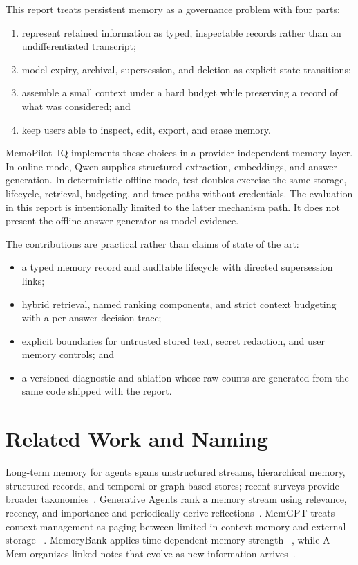 \documentclass[11pt]{article}
\newcommand{\sysname}{MemoPilot~IQ}
\begin{document}
This report treats persistent memory as a governance problem with four parts:

\begin{enumerate}[leftmargin=1.5em,itemsep=2pt]
  \item represent retained information as typed, inspectable records rather
  than an undifferentiated transcript;
  \item model expiry, archival, supersession, and deletion as explicit state
  transitions;
  \item assemble a small context under a hard budget while preserving a record
  of what was considered; and
  \item keep users able to inspect, edit, export, and erase memory.
\end{enumerate}

\sysname{} implements these choices in a provider-independent memory layer. In
online mode, Qwen supplies structured extraction, embeddings, and answer
generation. In deterministic offline mode, test doubles exercise the same
storage, lifecycle, retrieval, budgeting, and trace paths without credentials.
The evaluation in this report is intentionally limited to the latter mechanism
path. It does not present the offline answer generator as model evidence.

The contributions are practical rather than claims of state of the art:

\begin{itemize}[leftmargin=1.5em,itemsep=2pt]
  \item a typed memory record and auditable lifecycle with directed
  supersession links;
  \item hybrid retrieval, named ranking components, and strict context
  budgeting with a per-answer decision trace;
  \item explicit boundaries for untrusted stored text, secret redaction, and
  user memory controls; and
  \item a versioned diagnostic and ablation whose raw counts are generated from
  the same code shipped with the report.
\end{itemize}

\section{Related Work and Naming}
\label{sec:related}

Long-term memory for agents spans unstructured streams, hierarchical memory,
structured records, and temporal or graph-based stores; recent surveys provide
broader taxonomies~\citep{zhang2024survey,luo2026survey}. Generative Agents
rank a memory stream using relevance, recency, and importance and periodically
derive reflections~\citep{park2023generative}. MemGPT treats context management
as paging between limited in-context memory and external storage
~\citep{packer2023memgpt}. MemoryBank applies time-dependent memory strength
~\citep{zhong2024memorybank}, while A-Mem organizes linked notes that evolve as
new information arrives~\citep{xu2025amem}.
\end{document}
